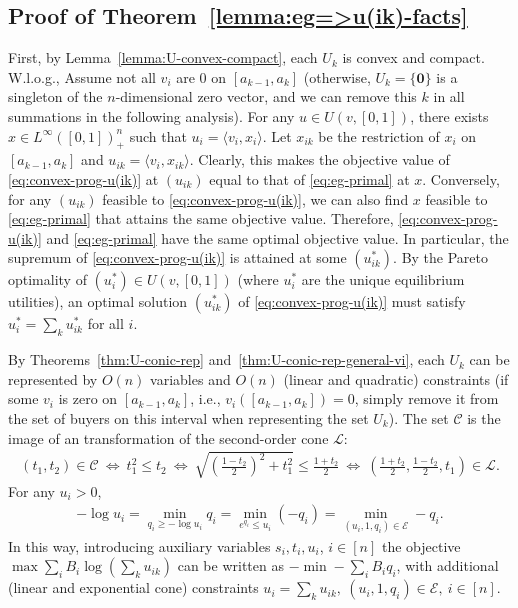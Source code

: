 \subsection*{Proof of Theorem~\ref{lemma:eg=>u(ik)-facts}}
First, by Lemma~\ref{lemma:U-convex-compact}, each $U_k$ is convex and compact. W.l.o.g., Assume not all $v_i$ are $0$ on $[a_{k-1}, a_k]$ (otherwise, $U_k = \{\mathbf{0}\}$ is a singleton of the $n$-dimensional zero vector, and we can remove this $k$ in all summations in the following analysis).
For any $u\in U(v, [0,1])$, there exists $x\in L^\infty([0,1])_+^n$ such that $u_i = \langle v_i, x_i\rangle$.  Let $x_{ik}$ be the restriction of $x_i$ on $[a_{k-1}, a_k]$ and $u_{ik} = \langle v_i, x_{ik}\rangle$. 
Clearly, this makes the objective value of \eqref{eq:convex-prog-u(ik)} at $(u_{ik})$ equal to that of \eqref{eq:eg-primal} at $x$. Conversely, for any $(u_{ik})$ feasible to \eqref{eq:convex-prog-u(ik)}, we can also find $x$ feasible to \eqref{eq:eg-primal} that attains the same objective value. Therefore, \eqref{eq:convex-prog-u(ik)} and \eqref{eq:eg-primal} have the same optimal objective value. 
In particular, the supremum of \eqref{eq:convex-prog-u(ik)} is attained at some $(u^*_{ik})$. 
By the Pareto optimality of $(u^*_i) \in U(v, [0,1])$ (where $u^*_i$ are the unique equilibrium utilities), an optimal solution $(u^*_{ik})$ of \eqref{eq:convex-prog-u(ik)} must satisfy $u^*_i = \sum_k u^*_{ik}$ for all $i$.

By Theorems~\ref{thm:U-conic-rep} and~\ref{thm:U-conic-rep-general-vi}, each $U_k$ can be represented by $O(n)$ variables and $O(n)$ (linear and quadratic) constraints (if some $v_i$ is zero on $[a_{k-1}, a_k]$, i.e., $v_i([a_{k-1}, a_k]) = 0$, simply remove it from the set of buyers on this interval when representing the set $U_k$). 
The set $\mathcal{C}$ is the image of an transformation of the second-order cone $\mathcal{L}$:
\begin{align*}
	(t_1, t_2) \in \mathcal{C} \ \Leftrightarrow \ t_1^2 \leq t_2 \ \Leftrightarrow \ \sqrt{\left(\frac{1-t_2}{2}\right)^2 + t_1^2} \leq \frac{1+t_2}{2} \ \Leftrightarrow \ \left( \frac{1+t_2}{2}, \frac{1-t_2}{2}, t_1 \right) \in \mathcal{L}.
\end{align*}
For any $u_i>0$,
\begin{align}
	- \log u_i = \min_{q_i\geq -\log u_i} q_i = \min_{e^{q_i} \leq u_i} (-q_i) = \min_{ (u_i, 1, q_i) \in \mathcal{E}} -q_i. \label{eq:log(ui)=>min(-qi)}
\end{align}
In this way, introducing auxiliary variables $s_i, t_i, u_i$, $i\in [n]$ the objective $\max \sum_i B_i \log \left( \sum_k u_{ik} \right)$ can be written as $-\min - \sum_i B_i q_i$, with additional (linear and exponential cone) constraints $u_i = \sum_k u_{ik}, \ 
(u_i, 1, q_i)\in \mathcal{E},\ i\in [n]$.

